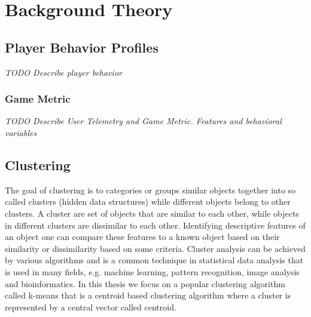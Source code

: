
\chapter{Background Theory} %
\label{Chapter2}


\section{Player Behavior Profiles}
\textit{TODO Describe player behavior}

\lipsum[1-2]

\subsection{Game Metric}

\textit{TODO Describe User Telemetry and Game Metric. Features and behavioral variables}

\lipsum[2-3]

\section{Clustering}
The goal of clustering is to categories or groups similar objects together into so called clusters (hidden data structures) while different objects belong to other clusters. A cluster are set of objects that are similar to each other, while objects in different clusters are dissimilar to each other. Identifying descriptive features of an object one can compare these features to a known object based on their similarity or dissimilarity based on some criteria. Cluster analysis can be achieved by various algorithms and is a common technique in statistical data analysis that is used in many fields, e.g. machine learning, pattern recognition, image analysis and bioinformatics. In this thesis we focus on a popular clustering algorithm called k-means that is a centroid based clustering algorithm where a cluster is represented by a central vector called centroid.

